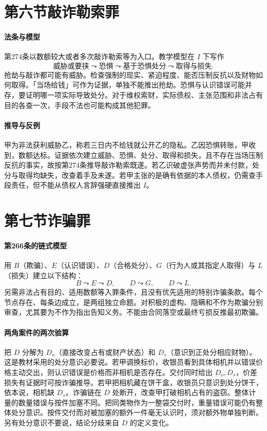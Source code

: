 \section{第六节\quad 敲诈勒索罪}

\paragraph{法条与模型}
第274条以数额较大或者多次敲诈勒索等为入口。教学模型在 $I$ 下写作
\[
 \text{威胁或要挟}\leadsto\text{恐惧}
 \leadsto\text{基于恐惧处分}\leadsto\text{取得与损失}.
\]
抢劫与敲诈都可能有威胁。检查强制的现实、紧迫程度、能否压制反抗以及财物如何取得。「当场给钱」可作为证据，单独不能推出抢劫。恐惧与认识错误可能并存，要证明哪一项实际导致处分。对于维权索财，实际债权、主张范围和非法占有目的各查一次，手段不法也可能构成其他犯罪。

\paragraph{推导与反例}
甲为非法获利威胁乙，称若三日内不给钱就公开乙的隐私。乙因恐惧转账，甲收到，数额达标。证据依次建立威胁、恐惧、处分、取得和损失，且不存在当场压制反抗的事实，故按第274条推导敲诈勒索既遂。若乙识破虚张声势而并未付款，处分与取得均缺失，改查着手及未遂。若甲主张的是确有依据的本人债权，仍需查手段责任，但不能从债权人言辞强硬直接推出 $I$。

\section{第七节\quad 诈骗罪}

\paragraph{第266条的链式模型}
用 $B$（欺骗）、$E$（认识错误）、$D$（合格处分）、$G$（行为人或其指定人取得）与 $L$（损失）建立以下结构：
\[
 B\leadsto E\leadsto D,\qquad
 D\leadsto G,\qquad D\leadsto L .
\]
另需非法占有目的、适用数额等入罪条件，且没有优先适用的特别诈骗条款。每个节点存在、每条边成立，是两组独立命题。对积极的虚构、隐瞒和不作为欺骗分别审查，尤其要为不作为指出告知义务。不能由合同落空或最终亏损反推最初欺骗。

\paragraph{两角案件的两次验算}
把 $D$ 分解为 $D_o$（直接改变占有或财产状态）和 $D_s$（意识到正处分相应财物）。这是教材采用的处分意识必要说。若甲调换标价，收银员看到具体相机并以错误价格主动交出，则认识错误是价格而非相机是否存在。交付同时给出 $D_o,D_s$，价差损失有证据时可按诈骗推导。若甲把相机藏在饼干盒，收银员只意识到处分饼干，依本说，相机缺 $D_s$。诈骗链在 $D$ 处断开，改查甲打破相机占有的盗窃。整体计量的数量错误与按件加塞不同。把同类物作为一整袋交付时，重量错误可能仍有整体处分意识。按件交付而对被加塞的额外一件毫无认识时，须对额外物单独判断。另有处分意识不要说，结论分歧来自 $D$ 的定义变化。

